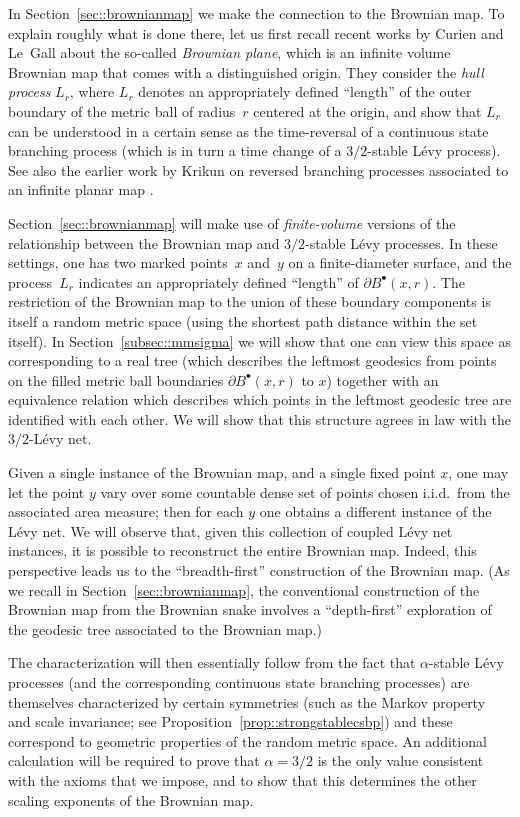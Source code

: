 \documentclass[10pt]{amsart}
\newcommand{\sbullet}{{\scriptscriptstyle\bullet}}
\theoremstyle{plain}
\numberwithin{theorem}{section}
\theoremstyle{definition}
\newcommand{\fb}[2]{B^\sbullet(#1,#2)}
\begin{document}
In Section~\ref{sec::brownianmap} we make the connection to the Brownian map. To explain roughly what is done there, let us first recall recent works by Curien and Le~Gall \cite{cl2014peeling, 2014arXiv1409.4026C} about the so-called \emph{Brownian plane}, which is an infinite volume Brownian map that comes with a distinguished origin. They consider the \emph{hull process} $L_r$, where $L_r$ denotes an appropriately defined ``length'' of the outer boundary of the metric ball of radius~$r$ centered at the origin, and show that $L_r$ can be understood in a certain sense as the time-reversal of a continuous state branching process (which is in turn a time change of a $3/2$-stable Lévy process). See also the earlier work by Krikun on reversed branching processes associated to an infinite planar map \cite{krikun2005uniform}.

Section~\ref{sec::brownianmap} will make use of \emph{finite-volume} versions of the relationship between the Brownian map and $3/2$-stable Lévy processes. In these settings, one has two marked points~$x$ and~$y$ on a finite-diameter surface, and the process~$L_r$ indicates an appropriately defined ``length'' of $\partial \fb{x}{r}$. The restriction of the Brownian map to the union of these boundary components is itself a random metric space (using the shortest path distance within the set itself). In Section~\ref{subsec::mmsigma} we will show that one can view this space as corresponding to a real tree (which describes the leftmost geodesics from points on the filled metric ball boundaries $\partial \fb{x}{r}$ to $x$) together with an equivalence relation which describes which points in the leftmost geodesic tree are identified with each other. We will show that this structure agrees in law with the $3/2$-Lévy net.

Given a single instance of the Brownian map, and a single fixed point $x$, one may let the point $y$ vary over some countable dense set of points chosen i.i.d.\ from the associated area measure; then for each $y$ one obtains a different instance of the Lévy net. We will observe that, given this collection of coupled Lévy net instances, it is possible to reconstruct the entire Brownian map.
Indeed, this perspective leads us to the ``breadth-first'' construction of the Brownian map. (As we recall in Section~\ref{sec::brownianmap}, the conventional construction of the Brownian map from the Brownian snake involves a ``depth-first'' exploration of the geodesic tree associated to the Brownian map.)

The characterization will then essentially follow from the fact that $\alpha$-stable Lévy processes (and the corresponding continuous state branching processes) are themselves characterized by certain symmetries (such as the Markov property and scale invariance; see Proposition~\ref{prop::strongstablecsbp}) and these correspond to geometric properties of the random metric space. An additional calculation will be required to prove that $\alpha = 3/2$ is the only value consistent with the axioms that we impose, and to show that this determines the other scaling exponents of the Brownian map.
\end{document}
